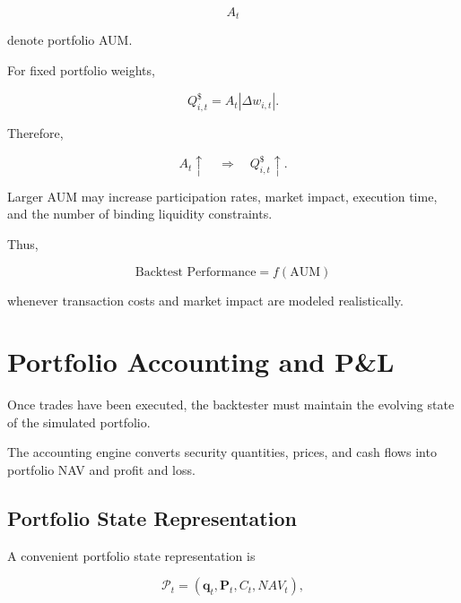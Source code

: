 \documentclass[11pt,a4paper]{article}
\begin{document}
\begin{equation}
A_t
\end{equation}

denote portfolio AUM.

For fixed portfolio weights,

\begin{equation}
Q_{i,t}^{\$}
=
A_t|\Delta w_{i,t}|.
\end{equation}

Therefore,

\begin{equation}
A_t\uparrow
\quad\Rightarrow\quad
Q_{i,t}^{\$}\uparrow.
\end{equation}

Larger AUM may increase participation rates, market impact, execution time, and
the number of binding liquidity constraints.

Thus,

\begin{equation}
\boxed{
\text{Backtest Performance}
=
f(\text{AUM})
}
\end{equation}

whenever transaction costs and market impact are modeled realistically.


\section{Portfolio Accounting and P\&L}
\label{sec:portfolio_accounting_pnl}

Once trades have been executed, the backtester must maintain the evolving state
of the simulated portfolio.

The accounting engine converts security quantities, prices, and cash flows into
portfolio NAV and profit and loss.


\subsection{Portfolio State Representation}

A convenient portfolio state representation is

\begin{equation}
\boxed{
\mathcal{P}_t
=
\left(
\mathbf{q}_t,
\mathbf{P}_t,
C_t,
NAV_t
\right),
}
\end{equation}
\end{document}
